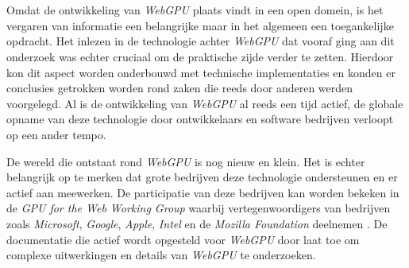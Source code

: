 
\chapter{}%
\label{ch:methodologie}


Omdat de ontwikkeling van \textit{WebGPU} plaats vindt in een open domein, is het vergaren van informatie een belangrijke maar in het algemeen een toegankelijke opdracht. Het inlezen in de technologie achter \textit{WebGPU} dat vooraf ging aan dit onderzoek was echter cruciaal om de praktische zijde verder te zetten. Hierdoor kon dit aspect worden onderbouwd met technische implementaties en konden er conclusies getrokken worden rond zaken die reeds door anderen werden voorgelegd. Al is de ontwikkeling van \textit{WebGPU} al reeds een tijd actief, de globale opname van deze technologie door ontwikkelaars en software bedrijven verloopt op een ander tempo. 

\bigbreak{}

De wereld die ontstaat rond \textit{WebGPU} is nog nieuw en klein. Het is echter belangrijk op te merken dat grote bedrijven deze technologie ondersteunen en er actief aan meewerken. De participatie van deze bedrijven kan worden bekeken in de \textit{GPU for the Web Working Group} waarbij vertegenwoordigers van bedrijven zoals \textit{Microsoft}, \textit{Google}, \textit{Apple}, \textit{Intel} en de \textit{Mozilla Foundation} deelnemen \autocite{W3C2024a}. De documentatie die actief wordt opgesteld voor \textit{WebGPU} door \textcite{W3C2023} laat toe om complexe uitwerkingen en details van \textit{WebGPU} te onderzoeken. 

